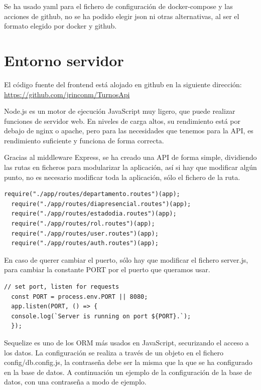 \documentclass[11pt,spanish,listoffigures,listoftables]{tfgetsinf}
\begin{document}
Se ha usado yaml para el fichero de configuración de docker-compose y las acciones de github, no se ha podido elegir json ni otras alternativas, al ser el formato elegido por docker y github. 

\section{Entorno servidor}
El código fuente del frontend está alojado en github en la siguiente dirección: \\
\url{https://github.com/jrinconm/TurnosApi}

Node.js es un motor de ejecución JavaScript muy ligero, que puede realizar funciones de servidor web. 
En niveles de carga altos, su rendimiento está por debajo de nginx o apache, pero para las necesidades que tenemos para la API, es rendimiento suficiente y funciona de forma correcta.

Gracias al middleware Express, se ha creado una API de forma simple, dividiendo las rutas en ficheros para modularizar la aplicación, así si hay que modificar algún punto, no es necesario modificar toda la aplicación, sólo el fichero de la ruta.

\begin{lstlisting}[style=ES6, caption={Importación rutas para Express}]
  require("./app/routes/departamento.routes")(app);
  require("./app/routes/diapresencial.routes")(app);
  require("./app/routes/estadodia.routes")(app);
  require("./app/routes/rol.routes")(app);
  require("./app/routes/user.routes")(app);
  require("./app/routes/auth.routes")(app);
\end{lstlisting}

  En caso de querer cambiar el puerto, sólo hay que modificar el fichero server.js, para cambiar la constante PORT por el puerto que queramos usar. 

\begin{lstlisting}[style=ES6, caption={Configuración del puerto de la API }]
  // set port, listen for requests
  const PORT = process.env.PORT || 8080;
  app.listen(PORT, () => {
  console.log(`Server is running on port ${PORT}.`);
  });
\end{lstlisting}

Sequelize es uno de los ORM más usados en JavaScript, securizando el acceso a los datos. 
La configuración se realiza a través de un objeto en el fichero config/db.config.js, la contraseña debe ser la misma que la que se ha configurado en la base de datos.
A continuación un ejemplo de la configuración de la base de datos, con una contraseña a modo de ejemplo.
\end{document}
